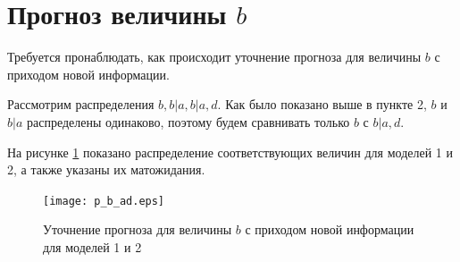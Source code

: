 \documentclass[12pt,a4paper,oneside,fleqn,leqno]{article}
\begin{document}
		\section{Прогноз величины $b$}
			Требуется пронаблюдать, как происходит уточнение прогноза для величины $b$ с приходом новой информации.\par
			Рассмотрим распределения $b, b|a, b|a,d$. Как было показано выше в пункте 2, $b$ и $b|a$ распределены одинаково, поэтому будем сравнивать только $b$ с $b|a, d$.\par
			На рисунке \ref{fig:distr_b_ad} показано распределение соответствующих величин для моделей 1 и 2, а также указаны их матожидания.
			\begin{figure}[H]
				\captionsetup{justification=centering}
				\texttt{[image: p\_b\_ad.eps]}
				\caption{Уточнение прогноза для величины $b$ с приходом новой информации для моделей 1 и 2}
				\label{fig:distr_b_ad}
			\end{figure}
\end{document}
